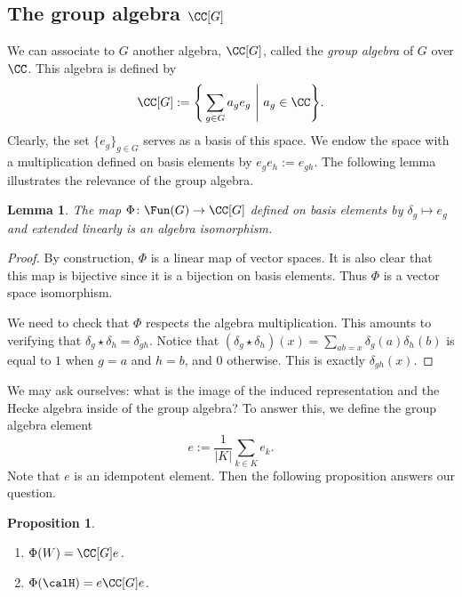 \documentclass[11pt]{amsart}
\newtheorem{lem}[thm]{Lemma}
\newtheorem{prop}[thm]{Proposition}
\theoremstyle{remark}
\begin{document}
\subsection{The group algebra $\CC[G]$}\label{Section1.4}
We can associate to $G$ another algebra, $\CC[G]$, called the \emph{group algebra} of $G$ over $\CC$.
This algebra is defined by
\[
	\CC[G] := \Bigg\{ \sum_{g\in G} a_g e_g\ \Bigg|\ a_g\in \CC \Bigg\}.
\]
Clearly, the set $\{e_g\}_{g\in G}$ serves as a basis of this space.
We endow the space with a multiplication defined on basis elements by $e_ge_h := e_{gh}$.
The following lemma illustrates the relevance of the group algebra.
\begin{lem}
	The map $\Phi\colon \Fun(G)\to\CC[G]$ defined on basis elements by $\delta_g\mapsto e_g$ and extended linearly is an algebra isomorphism.
\end{lem}
\begin{proof}
	By construction, $\Phi$ is a linear map of vector spaces.
	It is also clear that this map is bijective since it is a bijection on basis elements.
	Thus $\Phi$ is a vector space isomorphism.

	We need to check that $\Phi$ respects the algebra multiplication.
	This amounts to verifying that $\delta_g \star \delta_h = \delta_{gh}$.
	Notice that $(\delta_g\star\delta_h)(x) = \sum_{ab=x} \delta_g(a)\delta_h(b)$ is equal to $1$ when $g=a$ and $h=b$, and $0$ otherwise.
	This is exactly $\delta_{gh}(x)$.
\end{proof}
We may ask ourselves: what is the image of the induced representation and the Hecke algebra inside of the group algebra? To answer this, we define the group algebra element
\[
	e := \frac{1}{|K|} \sum_{k\in K} e_k.
\]
Note that $e$ is an idempotent element.
Then the following proposition answers our question.
\begin{prop}
	\begin{enumerate}[\itshape(i)]
		\item $\Phi(W) = \CC[G]e$.
		\item $\Phi(\calH) = e \CC[G] e$.
	\end{enumerate}
\end{prop}
\end{document}
